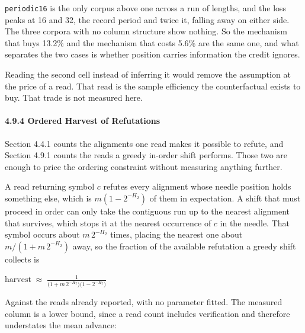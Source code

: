 \texttt{periodic16} is the only corpus above one across a run of lengths, and the loss peaks at 16 and 32, the record period and twice it, falling away on either side. The three corpora with no column structure show nothing. So the mechanism that buys 13.2\% and the mechanism that costs 5.6\% are the same one, and what separates the two cases is whether position carries information the credit ignores.

Reading the second cell instead of inferring it would remove the assumption at the price of a read. That read is the sample efficiency the counterfactual exists to buy. That trade is not measured here.

\paragraph{4.9.4 Ordered Harvest of Refutations}

Section 4.4.1 counts the alignments one read makes it possible to refute, and Section 4.9.1 counts the reads a greedy in-order shift performs. Those two are enough to price the ordering constraint without measuring anything further.

A read returning symbol \(c\) refutes every alignment whose needle position holds something else, which is \(m(1-2^{-H_2})\) of them in expectation. A shift that must proceed in order can only take the contiguous run up to the nearest alignment that survives, which stops it at the nearest occurrence of \(c\) in the needle. That symbol occurs about \(m\,2^{-H_2}\) times, placing the nearest one about \(m/(1+m\,2^{-H_2})\) away, so the fraction of the available refutation a greedy shift collects is

\(\text{harvest} \;\approx\; \frac{1}{\bigl(1 + m\,2^{-H_2}\bigr)\bigl(1 - 2^{-H_2}\bigr)}\)

Against the reads already reported, with no parameter fitted. The measured column is a lower bound, since a read count includes verification and therefore understates the mean advance:

